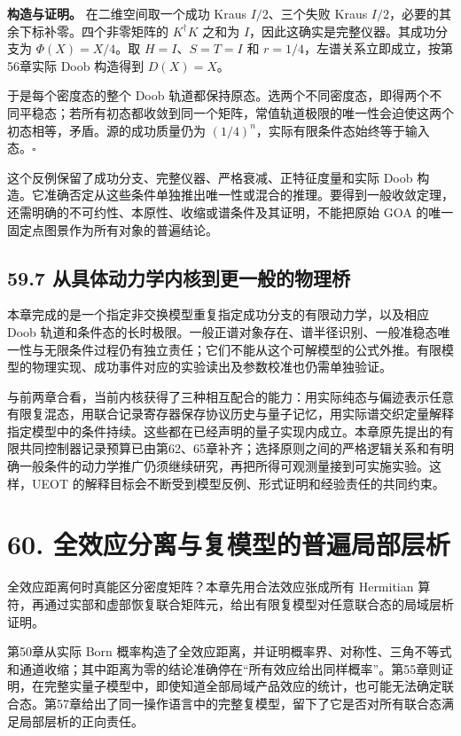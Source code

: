 \documentclass[
  11pt,
  oneside]{book}
\begin{document}
\textbf{构造与证明。} 在二维空间取一个成功 Kraus \(I/2\)、三个失败 Kraus
\(I/2\)，必要的其余下标补零。四个非零矩阵的 \(K^\dagger K\) 之和为
\(I\)，因此这确实是完整仪器。其成功分支为 \(\Phi(X)=X/4\)。取
\(H=I\)、\(S=T=I\) 和 \(r=1/4\)，左谱关系立即成立，按第56章实际 Doob
构造得到 \(D(X)=X\)。

于是每个密度态的整个 Doob
轨道都保持原态。选两个不同密度态，即得两个不同平稳态；若所有初态都收敛到同一个矩阵，常值轨道极限的唯一性会迫使这两个初态相等，矛盾。源的成功质量仍为
\((1/4)^n\)，实际有限条件态始终等于输入态。\(\square\)

这个反例保留了成功分支、完整仪器、严格衰减、正特征度量和实际 Doob
构造。它准确否定从这些条件单独推出唯一性或混合的推理。要得到一般收敛定理，还需明确的不可约性、本原性、收缩或谱条件及其证明，不能把原始
GOA 的唯一固定点图景作为所有对象的普遍结论。

\section{59.7 从具体动力学内核到更一般的物理桥}

本章完成的是一个指定非交换模型重复指定成功分支的有限动力学，以及相应
Doob
轨道和条件态的长时极限。一般正谱对象存在、谱半径识别、一般准稳态唯一性与无限条件过程仍有独立责任；它们不能从这个可解模型的公式外推。有限模型的物理实现、成功事件对应的实验读出及参数校准也仍需单独验证。

与前两章合看，当前内核获得了三种相互配合的能力：用实际纯态与偏迹表示任意有限复混态，用联合记录寄存器保存协议历史与量子记忆，用实际谱交织定量解释指定模型中的条件持续。这些都在已经声明的量子实现内成立。本章原先提出的有限共同控制器记录预算已由第62、65章补齐；选择原则之间的严格逻辑关系和有明确一般条件的动力学推广仍须继续研究，再把所得可观测量接到可实施实验。这样，UEOT
的解释目标会不断受到模型反例、形式证明和经验责任的共同约束。

\chapter{60. 全效应分离与复模型的普遍局部层析}\label{ch-60}\hypertarget{ch-60}{}

全效应距离何时真能区分密度矩阵？本章先用合法效应张成所有 Hermitian
算符，再通过实部和虚部恢复联合矩阵元，给出有限复模型对任意联合态的局域层析证明。

第50章从实际 Born
概率构造了全效应距离，并证明概率界、对称性、三角不等式和通道收缩；其中距离为零的结论准确停在``所有效应给出同样概率''。第55章则证明，在完整实量子模型中，即使知道全部局域产品效应的统计，也可能无法确定联合态。第57章给出了同一操作语言中的完整复模型，留下了它是否对所有联合态满足局部层析的正向责任。
\end{document}
